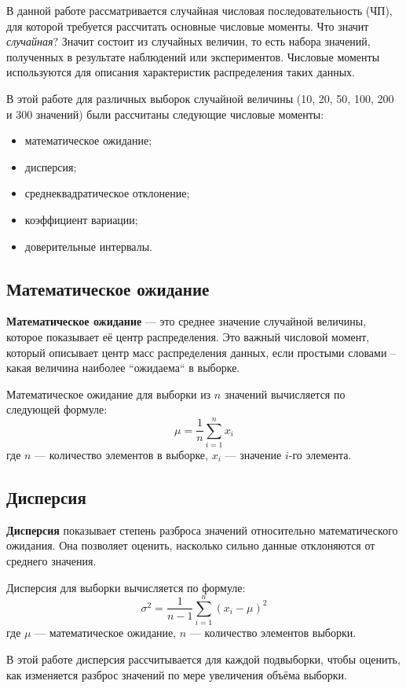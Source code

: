 В данной работе рассматривается случайная числовая последовательность (ЧП), для которой требуется рассчитать основные числовые моменты. Что значит \textit{случайная}? Значит состоит из случайных величин, то есть набора значений, полученных в результате наблюдений или экспериментов. Числовые моменты используются для описания характеристик распределения таких данных.

В этой работе для различных выборок случайной величины (10, 20, 50, 100, 200 и 300 значений) были рассчитаны следующие числовые моменты:
\begin{itemize}
	\item математическое ожидание;
	\item дисперсия;
	\item среднеквадратическое отклонение;
	\item коэффициент вариации;
	\item доверительные интервалы.
\end{itemize}

\subsection{Математическое ожидание}
\textbf{Математическое ожидание} — это среднее значение случайной величины, которое показывает её центр распределения. Это важный числовой момент, который описывает центр масс распределения данных, если простыми словами -- какая величина наиболее ``ожидаема`` в выборке.

Математическое ожидание для выборки из $n$ значений вычисляется по следующей формуле:
\[
	\mu = \frac{1}{n} \sum_{i=1}^{n} x_i
\]
где $n$ — количество элементов в выборке, $x_i$ — значение $i$-го элемента.


\subsection{Дисперсия}
\textbf{Дисперсия} показывает степень разброса значений относительно математического ожидания. Она позволяет оценить, насколько сильно данные отклоняются от среднего значения.

Дисперсия для выборки вычисляется по формуле:
\[
	\sigma^2 = \frac{1}{n - 1} \sum_{i=1}^{n} (x_i - \mu)^2
\]
где $\mu$ — математическое ожидание, $n$ — количество элементов выборки.

В этой работе дисперсия рассчитывается для каждой подвыборки, чтобы оценить, как изменяется разброс значений по мере увеличения объёма выборки.

